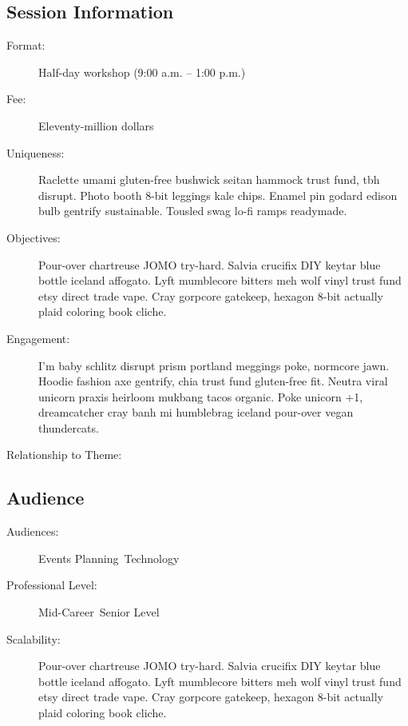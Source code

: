 \documentclass{report}
\begin{document}
              \subsection*{Session Information}
                \begin{description}
                  \item [Format:] Half-day workshop (9:00 a.m. – 1:00 p.m.)
							    
								  \item [Fee:]Eleventy-million dollars
							     
							    \item [Uniqueness:]Raclette umami gluten-free bushwick seitan hammock trust fund, tbh disrupt. Photo booth 8-bit leggings kale chips. Enamel pin godard edison bulb gentrify sustainable. Tousled swag lo-fi ramps readymade.
							    \item [Objectives:]Pour-over chartreuse JOMO try-hard. Salvia crucifix DIY keytar blue bottle iceland affogato. Lyft mumblecore bitters meh wolf vinyl trust fund etsy direct trade vape. Cray gorpcore gatekeep, hexagon 8-bit actually plaid coloring book cliche.
							    \item [Engagement:]I'm baby schlitz disrupt prism portland meggings poke, normcore jawn. Hoodie fashion axe gentrify, chia trust fund gluten-free fit. Neutra viral unicorn praxis heirloom mukbang tacos organic. Poke unicorn +1, dreamcatcher cray banh mi humblebrag iceland pour-over vegan thundercats.
							    \item [Relationship to Theme:]
							    
                \end{description}
              \subsection*{Audience}
                \begin{description}
                  \item [Audiences:]Events Planning~Technology~
                  \item[Professional Level:]Mid-Career~Senior Level~
                \item[Scalability:] Pour-over chartreuse JOMO try-hard. Salvia crucifix DIY keytar blue bottle iceland affogato. Lyft mumblecore bitters meh wolf vinyl trust fund etsy direct trade vape. Cray gorpcore gatekeep, hexagon 8-bit actually plaid coloring book cliche.

							
              \end{description}
\end{document}
